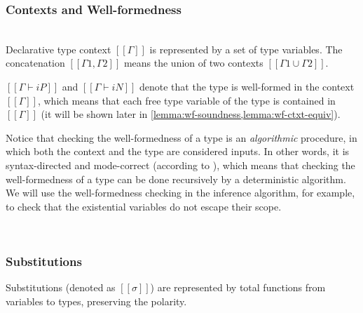 \subsubsection{Contexts and Well-formedness}

\begin{definition}
  \hfill \\
  Declarative type context $[[Γ]]$ is represented by a set of 
  type variables. The concatenation $[[Γ1, Γ2]]$ means the 
  union of two contexts $[[Γ1 ∪ Γ2]]$.
\end{definition}

$[[Γ ⊢ iP]]$ and $[[Γ ⊢ iN]]$ denote that the type is well-formed in the context $[[Γ]]$,
which means that each free type variable of the type is contained in $[[Γ]]$
(it will be shown later in \cref{lemma:wf-soundness,lemma:wf-ctxt-equiv}).

Notice that checking the well-formedness of a type
is an \emph{algorithmic} procedure, in which 
both the context and the type are considered inputs.
In other words, it is syntax-directed and mode-correct 
(according to \citet{dunfield2020:bidirectional}), 
which means that checking the well-formedness of a type
can be done recursively by a deterministic algorithm. 
We will use the well-formedness checking in the inference algorithm, 
for example, to check that the existential variables do not escape their scope.

\pagebreak[4]
\begin{algorithm}
  \label{alg:wf}
  \hfill\\
  \begin{minipage}[t]{0.45\textwidth}
    \ottdefnWFTNiWFLabeled[\apppref]{}
  \end{minipage}
  \begin{minipage}[t]{0.45\textwidth}
    \ottdefnWFTPiWFLabeled[\apppref]{}
  \end{minipage}
\end{algorithm}

\subsubsection{Substitutions}

\begin{definition}[Substitution]
  Substitutions (denoted as $[[σ]]$) 
  are represented by total functions from variables to types, preserving the polarity. 
\end{definition}

